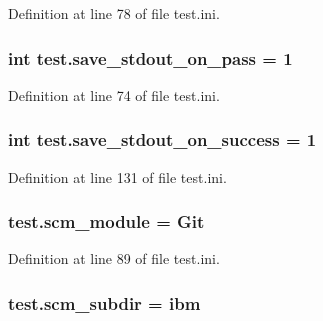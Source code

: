Definition at line 78 of file test.\-ini.

\hypertarget{namespacetest_ad6c2143462bf99c62dcb7cf691a56394}{
\subsubsection[{save\-\_\-stdout\-\_\-on\-\_\-pass}]{\setlength{\rightskip}{0pt plus 5cm}int test.\-save\-\_\-stdout\-\_\-on\-\_\-pass = 1}}\label{namespacetest_ad6c2143462bf99c62dcb7cf691a56394}


Definition at line 74 of file test.\-ini.

\hypertarget{namespacetest_a222c8f53a587af9263d043662a13938b}{
\subsubsection[{save\-\_\-stdout\-\_\-on\-\_\-success}]{\setlength{\rightskip}{0pt plus 5cm}int test.\-save\-\_\-stdout\-\_\-on\-\_\-success = 1}}\label{namespacetest_a222c8f53a587af9263d043662a13938b}


Definition at line 131 of file test.\-ini.

\hypertarget{namespacetest_a9c562b60dd319bbf228d80c2285c3fde}{
\subsubsection[{scm\-\_\-module}]{\setlength{\rightskip}{0pt plus 5cm}test.\-scm\-\_\-module = Git}}\label{namespacetest_a9c562b60dd319bbf228d80c2285c3fde}


Definition at line 89 of file test.\-ini.

\hypertarget{namespacetest_a954686f4e1dc4fd9b53353f75443c6a1}{
\subsubsection[{scm\-\_\-subdir}]{\setlength{\rightskip}{0pt plus 5cm}test.\-scm\-\_\-subdir = ibm}}\label{namespacetest_a954686f4e1dc4fd9b53353f75443c6a1}


